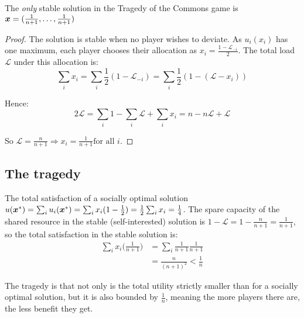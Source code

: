 	\begin{claim}
		The \textit{only} stable solution in the Tragedy of the Commons game is
		$\bm{x} = (\frac{1}{n+1}, \ldots, \frac{1}{n+1})$
	\end{claim}

	\begin{proof}
		The solution is stable when no player wishes to deviate. As $u_i(x_i)$
		has one maximum, each player chooses their allocation as $x_i = \frac{1
		- \mathcal{L}_{-i}}{2}$. The total load $\mathcal{L}$ under this
		allocation is:
		\begin{equation*}
			\sum_i x_i = \sum_i \frac{1}{2}(1 - \mathcal{L}_{-i}) = \sum_i
			\frac{1}{2}(1 - (\mathcal{L} - x_i))
		\end{equation*}

		Hence:
		\begin{equation*}
			2 \mathcal{L} = \sum_i 1 - \sum_i \mathcal{L} + \sum_i x_i = n -
			n\mathcal{L} + \mathcal{L}
		\end{equation*}

		So $\mathcal{L} = \frac{n}{n+1} \Rightarrow x_i = \frac{1}{n+1} \text{
			for all } i$.
	\end{proof}

\subsection{The tragedy}
	The total satisfaction of a socially optimal solution $u(\bm{x}^*) =
	\sum_i u_i(\bm{x}^*) = \sum_i x_i (1 - \frac{1}{2}) = \frac{1}{2}
	\sum_i x_i = \frac{1}{4}$.  The spare capacity of the shared resource in
	the stable (self-interested) solution is $1 - \mathcal{L} = 1 -
	\frac{n}{n+1} = \frac{1}{n+1}$, so the total satisfaction in the stable
	solution is:
	\begin{equation}
		\begin{split}
			\sum_i x_i \bigg(\frac{1}{n+1} \bigg) & = \sum_i \frac{1}{n+1} \frac{1}{n+1} \\
			& = \frac{n}{(n+1)^2} < \frac{1}{n}
		\end{split}
	\end{equation}
	
	The tragedy is that not only is the total utility strictly smaller than for
	a socially optimal solution, but it is also bounded by $\frac{1}{n}$,
	meaning the more players there are, the less benefit they get.
